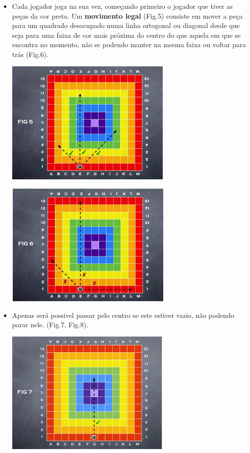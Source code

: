 \documentclass[a4paper]{article}
\begin{document}
\begin{itemize}
	\item Cada jogador joga na sua vez, começando primeiro o jogador que tiver as peças da cor preta. Um \textbf{movimento legal} (Fig.5) consiste em mover a peça para um quadrado desocupado numa linha ortogonal ou diagonal desde que seja para uma faixa de cor mais próxima do centro do que aquela em que se encontra no momento, não se podendo manter na mesma faixa ou voltar para trás (Fig.6).

\begin{center}
\includegraphics[scale=0.9]{fig5.png}\linebreak\linebreak 
\end{center}

\begin{center}
\includegraphics[scale=0.9]{fig6.png}\linebreak\linebreak 
\end{center}
	
	\newpage
	\item Apenas será possivel passar pelo centro se este estiver vazio, não podendo parar nele. (Fig.7, Fig.8).


\begin{center}
\includegraphics[scale=0.9]{fig7.png}\linebreak\linebreak 
\end{center}


\end{itemize}
\end{document}
